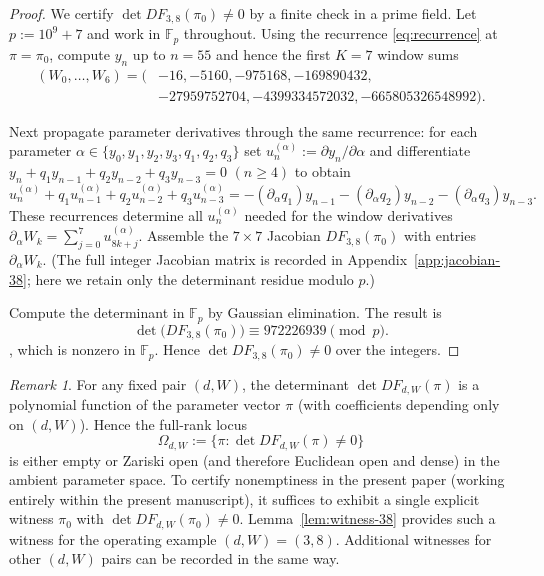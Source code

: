 \documentclass[11pt,reqno]{amsart}
\theoremstyle{definition}
\theoremstyle{remark}
\newtheorem{remark}[theorem]{Remark} %
\newcommand{\1}{\mathbf{1}}
\begin{document}
\begin{proof}
We certify $\det DF_{3,8}(\pi_0)\neq 0$ by a finite check in a prime field.
Let $p:=10^9+7$ and work in $\mathbb{F}_p$ throughout.
Using the recurrence \eqref{eq:recurrence} at $\pi=\pi_0$, compute $y_n$ up to $n=55$ and hence the first $K=7$ window sums
\[
\begin{aligned}
(W_0,\dots,W_6)=(&-16,-5160,-975168,-169890432,\\
&-27959752704,-4399334572032,-665805326548992).
\end{aligned}
\]

Next propagate parameter derivatives through the same recurrence:
for each parameter $\alpha\in\{y_0,y_1,y_2,y_3,q_1,q_2,q_3\}$ set
$u^{(\alpha)}_n:=\partial y_n/\partial \alpha$ and differentiate
$y_n+q_1y_{n-1}+q_2y_{n-2}+q_3y_{n-3}=0$ $(n\ge 4)$ to obtain
\[
u^{(\alpha)}_n+q_1u^{(\alpha)}_{n-1}+q_2u^{(\alpha)}_{n-2}+q_3u^{(\alpha)}_{n-3}
=-(\partial_\alpha q_1)y_{n-1}-(\partial_\alpha q_2)y_{n-2}-(\partial_\alpha q_3)y_{n-3}.
\]
These recurrences determine all $u^{(\alpha)}_n$ needed for the window derivatives
$\partial_\alpha W_k=\sum_{j=0}^{7}u^{(\alpha)}_{8k+j}$.
Assemble the $7\times 7$ Jacobian $DF_{3,8}(\pi_0)$ with entries $\partial_\alpha W_k$.
(The full integer Jacobian matrix is recorded in Appendix~\ref{app:jacobian-38}; here we retain only the determinant residue modulo $p$.)

Compute the determinant in $\mathbb{F}_p$ by Gaussian elimination. The result is
\begin{equation*}
\det\bigl(DF_{3,8}(\pi_0)\bigr)\equiv 972226939\pmod{p}.
\end{equation*}
, which is nonzero in $\mathbb{F}_p$. Hence $\det DF_{3,8}(\pi_0)\neq 0$ over the integers.
\end{proof}


\begin{remark}\label{rem:witness-points}
For any fixed pair $(d,W)$, the determinant $\det DF_{d,W}(\pi)$ is a polynomial function of the
parameter vector $\pi$ (with coefficients depending only on $(d,W)$). Hence the full-rank locus
\[
\Omega_{d,W}:=\{\pi:\det DF_{d,W}(\pi)\neq 0\}
\]
is either empty or Zariski open (and therefore Euclidean open and dense) in the ambient parameter space.
To certify nonemptiness in the present paper (working entirely within the present manuscript),
it suffices to exhibit a single explicit witness $\pi_0$ with $\det DF_{d,W}(\pi_0)\neq 0$.
Lemma~\ref{lem:witness-38} provides such a witness for the operating example $(d,W)=(3,8)$.
Additional witnesses for other $(d,W)$ pairs can be recorded in the same way.
\end{remark}
\end{document}
